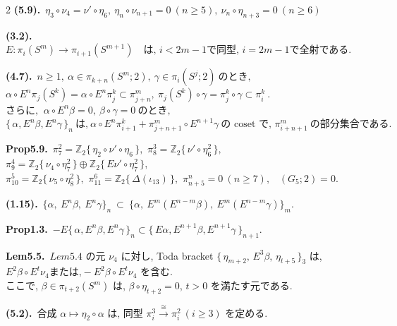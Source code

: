 \documentclass[10pt, leqno]{ltjsarticle}
\newcommand{\Ex}{E}        %
\newcommand{\todai}[2][]{\{\,#2\,\}_{#1}}      %
\newcommand{\gen}[1]{\{\,#1\,\}}       %
\newcommand{\pis}[2]{\pi_{#1}(#2)}       %
\newcommand{\pit}[2]{\pi_{#1}^{#2}}
\numberwithin{equation}{section}
\theoremstyle{plain}
\theoremstyle{definition}
\theoremstyle{remark}
\begin{document}
\begin{paracol}{2}
\noindent
\textbf{(5.9).}\
\(\eta_3\circ \nu_4= \nu'\circ \eta_6,\
\eta_n\circ \nu_{n+1}=0\ (n\ge5),\
\nu_n\circ \eta_{n+3}=0\ (n\ge6)\)

\noindent
\textbf{(3.2).}\
\(\Ex: \pis{i}{S^m} \longrightarrow \pis{i+1}{S^{m+1}}
\quad\text{は, } i<2m-1 \text{で同型, } i=2m-1 \text{で全射である. }\)

\noindent
\textbf{(4.7).}\
\(n\ge1, \ \alpha\in\pis{k+n}{S^m; 2},\ \gamma\in\pis{i}{S^j; 2}
    \ \text{のとき, }\)\\
\(\alpha\circ E^n\pis{j}{S^k} = \alpha\circ E^n \pit{j}{k}
  \subset \pit{j+n}{m},
  \ \pis{j}{S^k}\circ\gamma = \pit{j}{k}\circ\gamma \subset\pit{i}{k}\ . \)\\
\(\text{さらに, }\ \alpha\circ E^n\beta=0,\ \beta\circ\gamma = 0 \ \text{のとき, }\)\\
\(\todai[n]{\alpha, E^n\beta, E^n\gamma}\ \text{は,}\
  \alpha\circ E^n\pit{i+1}{k} + \pit{j+n+1}{m}\circ E^{n+1}\gamma\
  \text{の coset で, }\pit{i+n+1}{m} \ \text{の部分集合である. }\)

\noindent
\textbf{Prop5.9.}\
\(\pi^{2}_{7}=\mathbb Z_2\gen{\eta_{2}\circ\nu'\circ\eta_6},\) \quad
\(\pi^{3}_{8}=\mathbb Z_2\gen{\nu'\circ\eta_6^2},\) \quad
\(\pi^{4}_{9}=\mathbb Z_2\gen{\nu_{4}\circ\eta_7^2}\oplus \mathbb Z_2\gen{E\nu'\circ\eta_7^2},\) \\
\(\pi^{5}_{10}=\mathbb Z_2\gen{\nu_{5}\circ\eta_8^2},\) \quad
\(\pi^{6}_{11}=\mathbb Z_2\gen{\Delta(\iota_{13})},\) \quad
\(\pi^{n}_{n+5}=0\ (n\ge7),\) \
\((G_{5};2)=0.\)

\noindent
\textbf{(1.15).}\
\(\{\alpha,\ \Ex^n\beta,\ \Ex^n\gamma\}_n
\ \subset\
\bigl\{\alpha,\ \Ex^{m}(E^{n-m}\beta),\ E^{m}(E^{n-m}\gamma)\bigr\}_m .\)

\noindent
\textbf{Prop1.3.}\
\(-E\todai[n]{\alpha, E^n\beta, E^n\gamma}
\subset \todai[n+1]{E\alpha, E^{n+1}\beta, E^{n+1}\gamma}\).

\noindent
\textbf{Lem5.5.}\
$Lem 5.4$ の元 \(\nu_{4}\) に対し, 
Toda bracket 
\(\todai[3]{\eta_{m+2},\,E^{3}\beta,\,\eta_{t+5}}\) は,\\
\(
E^{2}\beta\circ E^{t}\nu_{4}\text{または,} -E^{2}\beta\circ E^{t}\nu_{4}
\)
を含む. \\
ここで, \(\beta\in\pi_{t+2}(S^{m})\) は,
\(\beta\circ \eta_{t+2}=0\), \(t>0\) を満たす元である. 

\noindent
\textbf{(5.2).}\
\(\text{合成 } \alpha\longmapsto \eta_2\circ \alpha \text{ は, 同型 } 
\pi^{3}_{i}\xrightarrow{\cong}\pi^{2}_{i}\ (i\ge3) 
\text{ を定める. }\)


\end{paracol}
\end{document}
